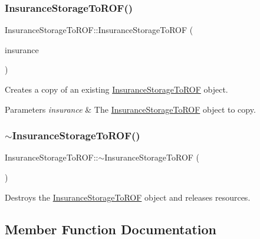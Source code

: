 \subsubsection{\texorpdfstring{Insurance\+Storage\+To\+R\+O\+F()}{InsuranceStorageToROF()}\hspace{0.1cm}{\footnotesize\ttfamily [2/2]}}
{\footnotesize\ttfamily Insurance\+Storage\+To\+R\+O\+F\+::\+Insurance\+Storage\+To\+R\+OF (\begin{DoxyParamCaption}\item[{\mbox{\hyperlink{classInsuranceStorageToROF}{Insurance\+Storage\+To\+R\+OF}} \&}]{insurance }\end{DoxyParamCaption})}



Creates a copy of an existing \mbox{\hyperlink{classInsuranceStorageToROF}{Insurance\+Storage\+To\+R\+OF}} object. 


\begin{DoxyParams}{Parameters}
{\em insurance} & The \mbox{\hyperlink{classInsuranceStorageToROF}{Insurance\+Storage\+To\+R\+OF}} object to copy. \\
\hline
\end{DoxyParams}
\mbox{\label{classInsuranceStorageToROF_aba2143897e3ec32d698d25a1aa572a73}} 
\subsubsection{\texorpdfstring{$\sim$\+Insurance\+Storage\+To\+R\+O\+F()}{~InsuranceStorageToROF()}}
{\footnotesize\ttfamily Insurance\+Storage\+To\+R\+O\+F\+::$\sim$\+Insurance\+Storage\+To\+R\+OF (\begin{DoxyParamCaption}{ }\end{DoxyParamCaption})\hspace{0.3cm}{\ttfamily [override]}}



Destroys the \mbox{\hyperlink{classInsuranceStorageToROF}{Insurance\+Storage\+To\+R\+OF}} object and releases resources. 



\subsection{Member Function Documentation}
\mbox{\label{classInsuranceStorageToROF_ac7d317a7f189739275960e4f021108d8}} 
